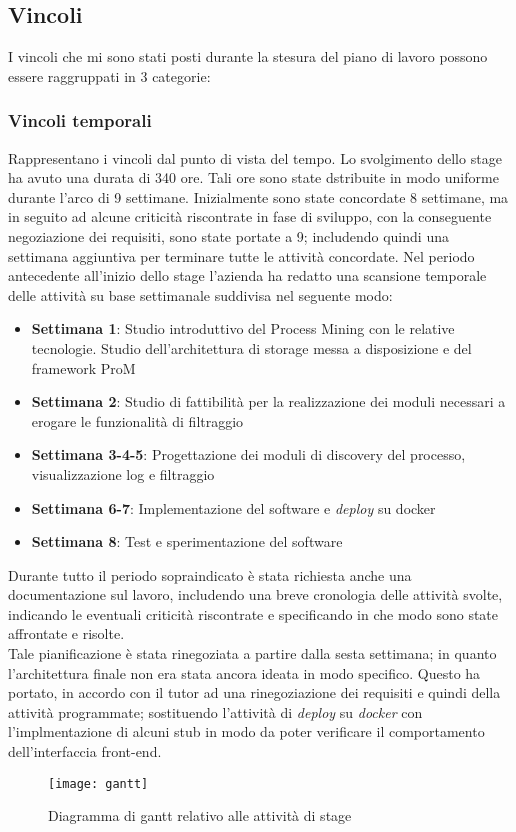 \subsection{Vincoli}
I vincoli che mi sono stati posti durante la stesura del piano di lavoro possono essere raggruppati in 3 categorie:
\subsubsection{Vincoli temporali}
Rappresentano i vincoli dal punto di vista del tempo. Lo svolgimento dello stage ha avuto una durata di 340 ore. Tali ore sono state dstribuite in modo uniforme durante l'arco di 9 settimane. Inizialmente sono state concordate 8 settimane, ma in seguito ad alcune criticità riscontrate in fase di sviluppo, con la conseguente negoziazione dei requisiti, sono state portate a 9; includendo quindi una settimana aggiuntiva per terminare tutte le attività concordate.
Nel periodo antecedente all'inizio dello stage l'azienda ha redatto una scansione temporale delle attività su base settimanale suddivisa nel seguente modo:
\begin{itemize}
	\item \textbf{Settimana 1}: Studio introduttivo del Process Mining con le relative tecnologie. Studio dell’architettura di storage messa a disposizione e del	framework ProM
	\item \textbf{Settimana 2}: Studio di fattibilità per la realizzazione dei moduli necessari a erogare le funzionalità di filtraggio
    \item \textbf{Settimana 3-4-5}: Progettazione dei moduli di discovery del processo, visualizzazione log e filtraggio
    \item \textbf{Settimana 6-7}: Implementazione del software e \textit{\gls{deploy}} su docker
    \item \textbf{Settimana 8}: Test e sperimentazione del software
\end{itemize}
Durante tutto il periodo sopraindicato è stata richiesta anche una documentazione sul lavoro, includendo una breve cronologia delle attività svolte, indicando le eventuali criticità riscontrate e specificando in che modo sono state affrontate e risolte.\\
Tale pianificazione è stata rinegoziata a partire dalla sesta settimana; in quanto l'architettura finale non era stata ancora ideata in modo specifico. Questo ha portato, in accordo con il tutor ad una rinegoziazione dei requisiti e quindi della attività programmate; sostituendo l'attività di \textit{deploy} su \textit{docker} con l'implmentazione di alcuni stub in modo da poter verificare il comportamento dell'interfaccia front-end.
\begin{figure}[!h] 
	\centering 
	\texttt{[image: gantt]} 
	\caption{Diagramma di gantt relativo alle attività di stage}
\end{figure}
